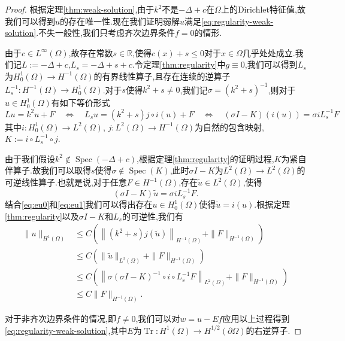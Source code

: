 \documentclass[a4paper,punct=banjiao,twoside]{ctexrep}
\theoremstyle{plain}
\theoremstyle{definition}
\theoremstyle{remark}
\begin{document}
\begin{proof}
根据定理\ref{thm:weak-solution},由于$k^2$不是$-\Delta+c$在$\Omega$上的Dirichlet特征值,故我们可以得到$u$的存在唯一性.现在我们证明弱解$u$满足\eqref{eq:regularity-weak-solution}.不失一般性,我们只考虑齐次边界条件$f=0$的情形.

由于$c\in L^{\infty}(\Omega)$,故存在常数$s\in\mathbb{R}$,使得$c(x)+s\leq 0$对于$x\in\Omega$几乎处处成立.我们记$L:=-\Delta +c$,$L_{s}=-\Delta +s +c$.令定理\ref{thm:regularity}中$g\equiv 0$,我们可以得到$L_{s}$为$H_{0}^1(\Omega)\rightarrow H^{-1}(\Omega)$的有界线性算子,且存在连续的逆算子$L_{s}^{-1}:H^{-1}(\Omega)\rightarrow H^{1}_0(\Omega)$.对于$s$使得$k^2+s\ne 0$,我们记$\sigma=(k^2+s)^{-1}$,则对于$u\in H^{1}_0(\Omega)$有如下等价形式
\begin{equation}\label{eq:eu0}
Lu=k^2 u +F \quad \Leftrightarrow \quad L_{s} u = (k^2+s)j\circ i(u) + F
\quad \Leftrightarrow \quad (\sigma I-K)(i(u)) = \sigma i L_s^{-1}F
\end{equation}
其中$i: H^{1}_0(\Omega)\rightarrow L^2(\Omega)$, $j:L^2(\Omega)\rightarrow H^{-1}(\Omega)$为自然的包含映射, $K:=i\circ L_s^{-1} \circ j$.

由于我们假设$k^2\notin\operatorname{Spec}(-\Delta+c)$,根据定理\ref{thm:regularity}的证明过程,$K$为紧自伴算子{\cite{Chen2elliptic}}.故我们可以取得$s$使得$\sigma\notin\operatorname{Spec}(K)$,此时$\sigma I-K$为$L^2(\Omega)\rightarrow L^2(\Omega)$的可逆线性算子.也就是说,对于任意$F\in H^{-1}(\Omega)$,存在$\tilde{u}\in L^2(\Omega)$,使得
\begin{equation}\label{eq:eu1}
(\sigma I-K)\tilde{u} = \sigma i L_s^{-1}F.
\end{equation}
结合\eqref{eq:eu0}和\eqref{eq:eu1}我们可以得出存在$u\in H^{1}_0(\Omega)$使得$\tilde{u}=i(u)$.根据定理\ref{thm:regularity}以及$\sigma I-K$和$L_{s}$的可逆性,我们有
\begin{equation*}
\begin{aligned}
\|u\|_{H^1(\Omega)} &\leq C\left( \left\|(k^2+s) j(\tilde{u})\right\|_{H^{-1}(\Omega)} + \|F\|_{H^{-1}(\Omega)} \right)\\
&\leq C\left( \|\tilde{u}\|_{L^2(\Omega)} + \|F\|_{H^{-1}(\Omega)} \right)\\
& \leq C\left( \left\|\sigma(\sigma I-K)^{-1}\circ i\circ L^{-1}_s F\right\|_{L^2(\Omega)} + \|F\|_{H^{-1}(\Omega)} \right)\\
& \leq C\|F\|_{H^{-1}(\Omega)}.
\end{aligned}
\end{equation*}

对于非齐次边界条件的情况,即$f\ne 0$,我们可以对$w=u-Ef$应用以上过程得到\eqref{eq:regularity-weak-solution},其中$E$为$\operatorname{Tr}:H^{1}(\Omega)\rightarrow H^{1/2}(\partial\Omega)$的右逆算子.
\end{proof}
\end{document}
